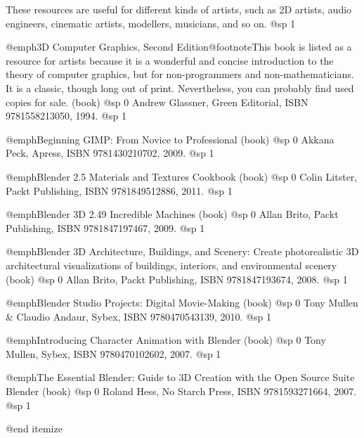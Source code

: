 
These resources are useful for different kinds of artists, such as 2D artists, audio engineers, cinematic artists, modellers, musicians, and so on.
@sp 1
\itemize

\item
@emph{3D Computer Graphics, Second Edition}@footnote{This book is listed as a resource for artists because it is a wonderful and concise introduction to the theory of computer graphics, but for non-programmers and non-mathematicians. It is a classic, though long out of print. Nevertheless, you can probably find used copies for sale.} (book)
@sp 0
Andrew Glassner, Green Editorial, ISBN 9781558213050, 1994.
@sp 1

\item
@emph{Beginning GIMP: From Novice to Professional} (book)
@sp 0
Akkana Peck, Apress, ISBN 9781430210702, 2009.
@sp 1

\item
@emph{Blender 2.5 Materials and Textures Cookbook} (book)
@sp 0
Colin Litster, Packt Publishing, ISBN 9781849512886, 2011.
@sp 1

\item
@emph{Blender 3D 2.49 Incredible Machines} (book)
@sp 0
Allan Brito, Packt Publishing, ISBN 9781847197467, 2009.
@sp 1

\item
@emph{Blender 3D Architecture, Buildings, and Scenery: Create photorealistic 3D architectural visualizations of buildings, interiors, and environmental scenery} (book)
@sp 0
Allan Brito, Packt Publishing, ISBN 9781847193674, 2008.
@sp 1

\item
@emph{Blender Studio Projects: Digital Movie-Making} (book)
@sp 0
Tony Mullen & Claudio Andaur, Sybex, ISBN 9780470543139, 2010.
@sp 1

\item
@emph{Introducing Character Animation with Blender} (book)
@sp 0
Tony Mullen, Sybex, ISBN 9780470102602, 2007.
@sp 1

\item
@emph{The Essential Blender: Guide to 3D Creation with the Open Source Suite Blender} (book)
@sp 0
Roland Hess, No Starch Press, ISBN 9781593271664, 2007.
@sp 1

@end itemize

